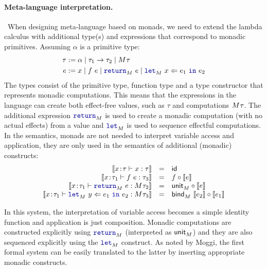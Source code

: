 \paragraph{Meta-language interpretation.} ~When designing meta-language based on monads, we need to
extend the lambda calculus with additional type(s) and expressions that correspond to monadic
primitives. Assuming $\alpha$ is a primitive type:
%
\begin{align*}
\tau &:= \alpha \sep \tau_1 \rightarrow \tau_2 \sep \mtyp{}{\tau} \\
   e &:= x \sep f~e \sep \kvd{return}_\mtyp{}{}~e \sep \kvd{let}_\mtyp{}{}~x \Leftarrow e_1~\kvd{in}~e_2
\end{align*}
%
The types consist of the primitive type, function type and a type constructor that 
represents monadic computations. This means that the expressions in the language can create both
effect-free values, such as $\tau$ and computations $M^{}\tau$. The additional expression
$\kvd{return}_\mtyp{}{}$ is used to create a monadic computation (with no actual effects) from a
value and $\kvd{let}_\mtyp{}{}$ is used to sequence effectful computations. In the semantics, 
monads are not needed to interpret variable access and application, they are only used in the 
semantics of additional (monadic) constructs:
%
\begin{equation*}
\begin{array}{rcl}
\sem{x\!:\!\tau \vdash x : \tau} &=& \idf{}\\
\sem{x\!:\!\tau_1 \vdash f~e : \tau_3} &=& f \circ \sem{e}\\
\sem{x\!:\!\tau_1 \vdash \kvd{return}_\mtyp{}{}~e : \mtyp{}{\tau_2}} &=& \ident{unit}_\mtyp{}{} \circ \sem{e}\\
\sem{x\!:\!\tau_1 \vdash \kvd{let}_\mtyp{}{}~y \Leftarrow e_1~\kvd{in}~e_2 : \mtyp{}{\tau_3}} &=& 
  \ident{bind}_\mtyp{}{}~\sem{e_2} \circ \sem{e_1}
\end{array}
\end{equation*}

\noindent
In this system, the interpretation of variable access becomes a simple identity function and
application is just composition. Monadic computations are constructed explicitly using 
$\kvd{return}_\mtyp{}{}$ (interpreted as $\textnormal{\sffamily unit}_M^{}$) and they are also sequenced
explicitly using the $\kvd{let}_\mtyp{}{}$ construct. As noted by Moggi, the first formal system
can be easily translated to the latter by inserting appropriate monadic constructs.

